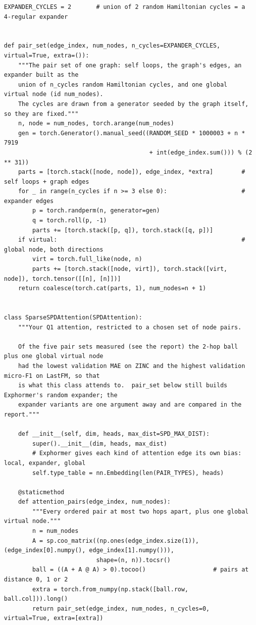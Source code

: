 \begin{lstlisting}[style=p1py]
EXPANDER_CYCLES = 2       # union of 2 random Hamiltonian cycles = a 4-regular expander


def pair_set(edge_index, num_nodes, n_cycles=EXPANDER_CYCLES, virtual=True, extra=()):
    """The pair set of one graph: self loops, the graph's edges, an expander built as the
    union of n_cycles random Hamiltonian cycles, and one global virtual node (id num_nodes).
    The cycles are drawn from a generator seeded by the graph itself, so they are fixed."""
    n, node = num_nodes, torch.arange(num_nodes)
    gen = torch.Generator().manual_seed((RANDOM_SEED * 1000003 + n * 7919
                                         + int(edge_index.sum())) % (2 ** 31))
    parts = [torch.stack([node, node]), edge_index, *extra]        # self loops + graph edges
    for _ in range(n_cycles if n >= 3 else 0):                     # expander edges
        p = torch.randperm(n, generator=gen)
        q = torch.roll(p, -1)
        parts += [torch.stack([p, q]), torch.stack([q, p])]
    if virtual:                                                    # global node, both directions
        virt = torch.full_like(node, n)
        parts += [torch.stack([node, virt]), torch.stack([virt, node]), torch.tensor([[n], [n]])]
    return coalesce(torch.cat(parts, 1), num_nodes=n + 1)


class SparseSPDAttention(SPDAttention):
    """Your Q1 attention, restricted to a chosen set of node pairs.

    Of the five pair sets measured (see the report) the 2-hop ball plus one global virtual node
    had the lowest validation MAE on ZINC and the highest validation micro-F1 on LastFM, so that
    is what this class attends to.  pair_set below still builds Exphormer's random expander; the
    expander variants are one argument away and are compared in the report."""

    def __init__(self, dim, heads, max_dist=SPD_MAX_DIST):
        super().__init__(dim, heads, max_dist)
        # Exphormer gives each kind of attention edge its own bias: local, expander, global
        self.type_table = nn.Embedding(len(PAIR_TYPES), heads)

    @staticmethod
    def attention_pairs(edge_index, num_nodes):
        """Every ordered pair at most two hops apart, plus one global virtual node."""
        n = num_nodes
        A = sp.coo_matrix((np.ones(edge_index.size(1)), (edge_index[0].numpy(), edge_index[1].numpy())),
                          shape=(n, n)).tocsr()
        ball = ((A + A @ A) > 0).tocoo()                   # pairs at distance 0, 1 or 2
        extra = torch.from_numpy(np.stack([ball.row, ball.col])).long()
        return pair_set(edge_index, num_nodes, n_cycles=0, virtual=True, extra=[extra])


\end{lstlisting}

